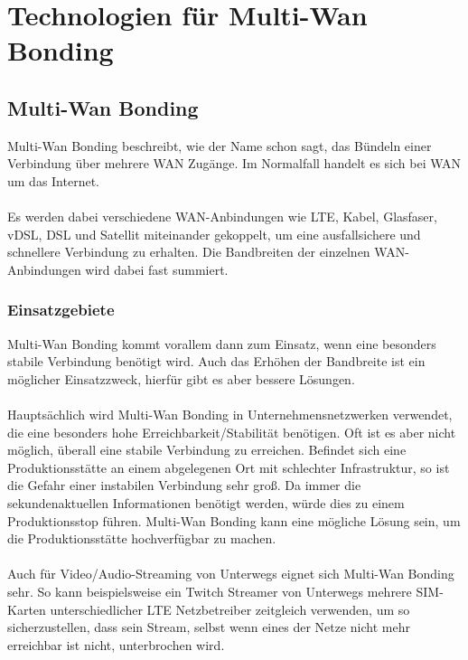 \chapter{Technologien für Multi-Wan Bonding}
\label{chap:verwendeteTechnologien}
\section{Multi-Wan Bonding}
Multi-Wan Bonding beschreibt, wie der Name schon sagt, das Bündeln einer Verbindung über mehrere WAN Zugänge. Im Normalfall handelt es sich bei WAN um das Internet. 
\\\\
Es werden dabei verschiedene WAN-Anbindungen wie LTE, Kabel, Glasfaser, vDSL, DSL und Satellit miteinander gekoppelt, um eine ausfallsichere und schnellere Verbindung zu erhalten. Die Bandbreiten der einzelnen WAN-Anbindungen wird dabei fast summiert. 

\subsection{Einsatzgebiete}
Multi-Wan Bonding kommt vorallem dann zum Einsatz, wenn eine besonders stabile Verbindung benötigt wird. Auch das Erhöhen der Bandbreite ist ein möglicher Einsatzzweck, hierfür gibt es aber bessere Lösungen.
\\\\
Hauptsächlich wird Multi-Wan Bonding in Unternehmensnetzwerken verwendet, die eine besonders hohe Erreichbarkeit/Stabilität benötigen. Oft ist es aber nicht möglich, überall eine stabile Verbindung zu erreichen. Befindet sich eine Produktionsstätte an einem abgelegenen Ort mit schlechter Infrastruktur, so ist die Gefahr einer instabilen Verbindung sehr groß. Da immer die sekundenaktuellen Informationen benötigt werden, würde dies zu einem Produktionsstop führen. Multi-Wan Bonding kann eine mögliche Lösung sein, um die Produktionsstätte hochverfügbar zu machen.
\\\\
Auch für Video/Audio-Streaming von Unterwegs eignet sich Multi-Wan Bonding sehr. So kann beispielsweise ein Twitch Streamer von Unterwegs mehrere SIM-Karten unterschiedlicher LTE Netzbetreiber zeitgleich verwenden, um so sicherzustellen, dass sein Stream, selbst wenn eines der Netze nicht mehr erreichbar ist nicht, unterbrochen wird.

\newpage
